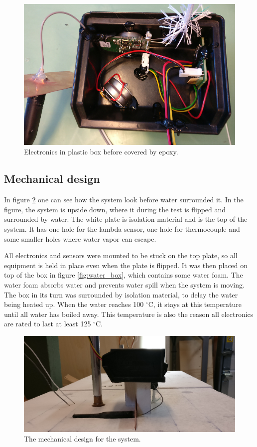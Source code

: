\begin{figure}
    \centering
    \includegraphics[width=.8\textwidth]{Chapter3/Figures/electronics_box.png}
    \caption{Electronics in plastic box before covered by epoxy.}
    \label{fig:electronics_box}
\end{figure}


\subsection{Mechanical design}


In figure \ref{fig:mechanical_construction} one can see how the system look before water surrounded it. In the figure, the system is upside down, where it during the test is flipped and surrounded by water. The white plate is isolation material and is the top of the system. It has one hole for the lambda sensor, one hole for thermocouple and some smaller holes where water vapor can escape.


All electronics and sensors were mounted to be stuck on the top plate, so all equipment is held in place even when the plate is flipped. It was then placed on top of the box in figure \ref{fig:water_box}, which contains some water foam. The water foam absorbs water and prevents water spill when the system is moving. The box in its turn was surrounded by isolation material, to delay the water being heated up. When the water reaches 100 $^\circ$C, it stays at this temperature until all water has boiled away. This temperature is also the reason all electronics are rated to last at least 125 $^\circ$C.


\begin{figure}
    \centering
    \includegraphics[width=.8\textwidth]{Chapter3/Figures/mechanical_construction.png}
    \caption{The mechanical design for the system.}
    \label{fig:mechanical_construction}
\end{figure}


